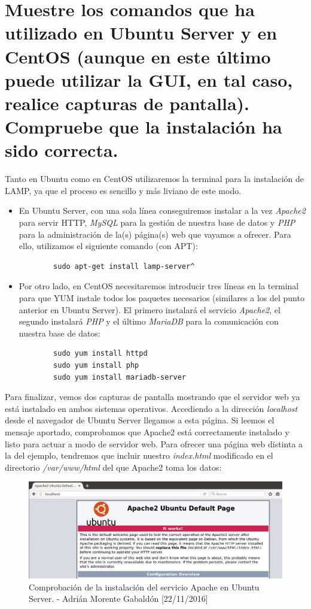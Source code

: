 \section{Muestre los comandos que ha utilizado en Ubuntu Server y en CentOS (aunque en este último puede utilizar la GUI, en tal caso, realice capturas de pantalla). Compruebe que la instalación ha sido correcta.}
Tanto en Ubuntu como en CentOS utilizaremos la terminal para la instalación de LAMP, ya que el proceso es sencillo y más liviano de este modo.
\begin{itemize}
	\item En Ubuntu Server, con una sola línea conseguiremos instalar a la vez \emph{Apache2} para servir HTTP, \emph{MySQL} para la gestión de nuestra base de datos y \emph{PHP} para la administración de la(s) página(s) web que vayamos a ofrecer. Para ello, utilizamos el siguiente comando (con APT):
	\begin{verbatim}
		sudo apt-get install lamp-server^
	\end{verbatim}
	\item Por otro lado, en CentOS necesitaremos introducir tres líneas en la terminal para que YUM instale todos los paquetes necesarios (similares a los del punto anterior en Ubuntu Server). El primero instalará el servicio \emph{Apache2}, el segundo instalará \emph{PHP} y el último \emph{MariaDB} para la comunicación con nuestra base de datos:
	\begin{verbatim}
		sudo yum install httpd
		sudo yum install php
		sudo yum install mariadb-server
	\end{verbatim}
\end{itemize}
Para finalizar, vemos dos capturas de pantalla mostrando que el servidor web ya está instalado en ambos sistemas operativos.
Accediendo a la dirección \emph{localhost} desde el navegador de Ubuntu Server llegamos a esta página. Si leemos el mensaje aportado, comprobamos que Apache2 está correctamente instalado y listo para actuar a modo de servidor web. Para ofrecer una página web distinta a la del ejemplo, tendremos que incluir nuestro \emph{index.html} modificado en el directorio \emph{/var/www/html} del que Apache2 toma los datos:
\begin{figure}[H]
	\centering
	\includegraphics[scale=0.5]{apache-ubuntu}
	\caption{Comprobación de la instalación del servicio Apache en Ubuntu Server. - Adrián Morente Gabaldón [22/11/2016]}
	\label{fig:figura8}
\end{figure}
